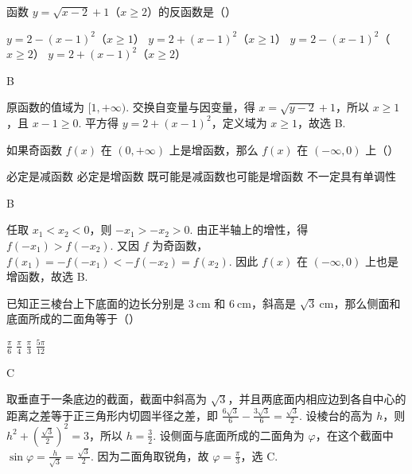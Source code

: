 \begin{problem}
函数 \(y = \sqrt{x - 2} + 1\)（\(x \geqslant 2\)）的反函数是（\quad）

\choices
    {\(y = 2 - (x - 1)^2\)（\(x \geqslant 1\)）}
    {\(y = 2 + (x - 1)^2\)（\(x \geqslant 1\)）}
    {\(y = 2 - (x - 1)^2\)（\(x \geqslant 2\)）}
    {\(y = 2 + (x - 1)^2\)（\(x \geqslant 2\)）}
\end{problem}

\begin{answer}
B
\end{answer}

\begin{solution}
原函数的值域为 \([1,+\infty)\). 交换自变量与因变量，得 \(x=\sqrt{y-2}+1\)，所以 \(x\geqslant1\)，且 \(x-1\geqslant0\). 平方得 \(y=2+(x-1)^2\)，定义域为 \(x\geqslant1\)，故选 B.
\end{solution}

\begin{problem}
如果奇函数 \(f(x)\) 在 \((0,+\infty)\) 上是增函数，那么 \(f(x)\) 在 \((-\infty,0)\) 上（\quad）

\choices
    {必定是减函数}
    {必定是增函数}
    {既可能是减函数也可能是增函数}
    {不一定具有单调性}
\end{problem}

\begin{answer}
B
\end{answer}

\begin{solution}
任取 \(x_1<x_2<0\)，则 \(-x_1>-x_2>0\). 由正半轴上的增性，得 \(f(-x_1)>f(-x_2)\). 又因 \(f\) 为奇函数，\(f(x_1)=-f(-x_1)<-f(-x_2)=f(x_2)\). 因此 \(f(x)\) 在 \((-\infty,0)\) 上也是增函数，故选 B.
\end{solution}

\begin{problem}
已知正三棱台上下底面的边长分别是 \(3\mathrm{~cm}\) 和 \(6\mathrm{~cm}\)，斜高是 \(\sqrt{3}\mathrm{~cm}\)，那么侧面和底面所成的二面角等于（\quad）

\choices
    {\(\frac{\pi}{6}\)}
    {\(\frac{\pi}{4}\)}
    {\(\frac{\pi}{3}\)}
    {\(\frac{5\pi}{12}\)}
\end{problem}

\begin{answer}
C
\end{answer}

\begin{solution}
取垂直于一条底边的截面，截面中斜高为 \(\sqrt3\)，并且两底面内相应边到各自中心的距离之差等于正三角形内切圆半径之差，即 \(\frac{6\sqrt3}{6}-\frac{3\sqrt3}{6}=\frac{\sqrt3}{2}\). 设棱台的高为 \(h\)，则 \(h^2+\left(\frac{\sqrt3}{2}\right)^2=3\)，所以 \(h=\frac32\). 设侧面与底面所成的二面角为 \(\varphi\)，在这个截面中 \(\sin\varphi=\frac{h}{\sqrt3}=\frac{\sqrt3}{2}\). 因为二面角取锐角，故 \(\varphi=\frac\pi3\)，选 C.
\end{solution}

